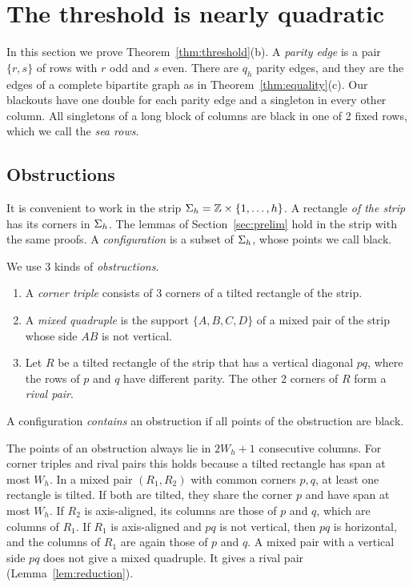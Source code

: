 \section{The threshold is nearly quadratic}\label{sec:threshold}

In this section we prove Theorem~\ref{thm:threshold}(b). A \emph{parity edge} is a pair
$\{r,s\}$ of rows with $r$ odd and $s$ even. There are $q_h$ parity edges, and they are the
edges of a complete bipartite graph as in Theorem~\ref{thm:equality}(c). Our blackouts have
one double for each parity edge and a singleton in every other column. All singletons of a
long block of columns are black in one of 2 fixed rows, which we call the \emph{sea rows}.

\subsection{Obstructions}

It is convenient to work in the strip $\Sigma_h=\mathbb{Z}\times\{1,\dots,h\}$. A rectangle
\emph{of the strip} has its corners in $\Sigma_h$. The lemmas of Section~\ref{sec:prelim} hold
in the strip with the same proofs. A \emph{configuration} is a subset of $\Sigma_h$, whose
points we call black.

\begin{definition}\label{def:obstruction}
We use 3 kinds of \emph{obstructions}.
\begin{enumerate}[(1)]
\item A \emph{corner triple} consists of 3 corners of a tilted rectangle of the strip.
\item A \emph{mixed quadruple} is the support $\{A,B,C,D\}$ of a mixed pair of the strip
whose side $AB$ is not vertical.
\item Let $R$ be a tilted rectangle of the strip that has a vertical diagonal $pq$, where
the rows of $p$ and $q$ have different parity. The other 2 corners of $R$ form a
\emph{rival pair}.
\end{enumerate}
A configuration \emph{contains} an obstruction if all points of the obstruction are black.
\end{definition}

The points of an obstruction always lie in $2W_h+1$ consecutive columns. For corner triples
and rival pairs this holds because a tilted rectangle has span at most $W_h$. In a mixed
pair $(R_1,R_2)$ with common corners $p,q$, at least one rectangle is tilted. If both are
tilted, they share the corner $p$ and have span at most $W_h$. If $R_2$ is axis-aligned,
its columns are those of $p$ and $q$, which are columns of $R_1$. If $R_1$ is axis-aligned
and $pq$ is not vertical, then $pq$ is horizontal, and the columns of $R_1$ are again those
of $p$ and $q$. A mixed pair with a vertical side $pq$ does not give a mixed quadruple. It
gives a rival pair (Lemma~\ref{lem:reduction}).


